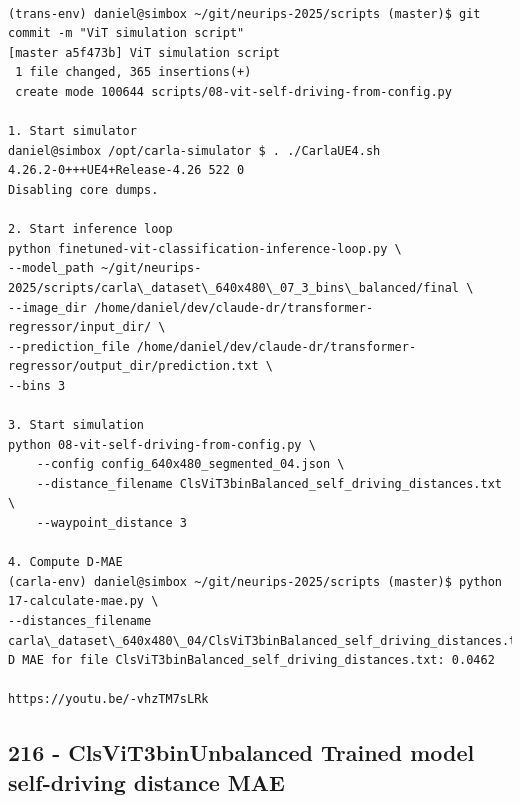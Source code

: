 \begin{verbatim}

(trans-env) daniel@simbox ~/git/neurips-2025/scripts (master)$ git commit -m "ViT simulation script"
[master a5f473b] ViT simulation script
 1 file changed, 365 insertions(+)
 create mode 100644 scripts/08-vit-self-driving-from-config.py
 
1. Start simulator
daniel@simbox /opt/carla-simulator $ . ./CarlaUE4.sh 
4.26.2-0+++UE4+Release-4.26 522 0
Disabling core dumps.

2. Start inference loop
python finetuned-vit-classification-inference-loop.py \
--model_path ~/git/neurips-2025/scripts/carla\_dataset\_640x480\_07_3_bins\_balanced/final \
--image_dir /home/daniel/dev/claude-dr/transformer-regressor/input_dir/ \
--prediction_file /home/daniel/dev/claude-dr/transformer-regressor/output_dir/prediction.txt \
--bins 3

3. Start simulation
python 08-vit-self-driving-from-config.py \
    --config config_640x480_segmented_04.json \
    --distance_filename ClsViT3binBalanced_self_driving_distances.txt \
    --waypoint_distance 3

4. Compute D-MAE
(carla-env) daniel@simbox ~/git/neurips-2025/scripts (master)$ python 17-calculate-mae.py \
--distances_filename carla\_dataset\_640x480\_04/ClsViT3binBalanced_self_driving_distances.txt
D MAE for file ClsViT3binBalanced_self_driving_distances.txt: 0.0462

https://youtu.be/-vhzTM7sLRk

\end{verbatim}

\subsection{216 - ClsViT3binUnbalanced Trained model self-driving distance MAE}
\label{app_res:216}

